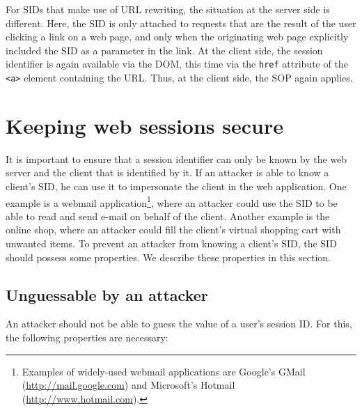 For SIDs that make use of URL rewriting, the situation at the server side is different. Here, the SID is only attached to requests that are the result of the user clicking a link on a web page, and only when the originating web page explicitly included the SID as a parameter in the link. At the client side, the session identifier is again available via the DOM, this time via the \texttt{href} attribute of the \texttt{<a>} element containing the URL. Thus, at the client side, the SOP again applies.

\section{Keeping web sessions secure}\label{secure-sessions}

It is important to ensure that a session identifier can only be known by the web server and the client that is identified by it. If an attacker is able to know a client's SID, he can use it to impersonate the client in the web application. One example is a webmail application\footnote{Examples of widely-used webmail applications are Google's GMail (\url{http://mail.google.com}) and Microsoft's Hotmail (\url{http://www.hotmail.com}).}, where an attacker could use the SID to be able to read and send e-mail on behalf of the client. Another example is the online shop, where an attacker could fill the client's virtual shopping cart with unwanted items. To prevent an attacker from knowing a client's SID, the SID should possess some properties. We describe these properties in this section.

\subsection{Unguessable by an attacker}

An attacker should not be able to guess the value of a user's session ID. For this, the following properties are necessary:

